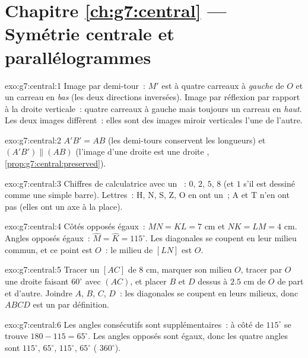 \section*{Chapitre \ref{ch:g7:central} --- Symétrie centrale et parallélogrammes}

\begin{solution}{exo:g7:central:1}
Image par demi-tour~: $M'$ est à quatre carreaux à \emph{gauche} de
$O$ et un carreau en \emph{bas} (les deux directions inversées). Image
par réflexion par rapport à la droite verticale~: quatre carreaux à
gauche mais toujours un carreau en \emph{haut}. Les deux images
diffèrent~: elles sont des images miroir verticales l'une de l'autre.
\end{solution}

\begin{solution}{exo:g7:central:2}
$A'B' = AB$ (les demi-tours conservent les longueurs) et
$(A'B') \parallel (AB)$ (l'image d'une droite est une droite
, \cref{prop:g7:central:preserved}).
\end{solution}

\begin{solution}{exo:g7:central:3}
Chiffres de calculatrice avec un ~: $0$, $2$, $5$,
$8$ (et $1$ s'il est dessiné comme une simple barre). Lettres~: H, N,
S, Z, O en ont un~; A et T n'en ont pas (elles ont un axe à la
place).
\end{solution}

\begin{solution}{exo:g7:central:4}
Côtés opposés égaux~: $MN = KL = 7$ cm et $NK = LM = 4$ cm. Angles
opposés égaux~: $\widehat M = \widehat K = 115^\circ$. Les diagonales
se coupent en leur milieu commun, et ce point est $O$~: le milieu de
$[LN]$ est $O$.
\end{solution}

\begin{solution}{exo:g7:central:5}
Tracer un  $[AC]$ de $8$ cm, marquer son milieu $O$, tracer
par $O$ une droite faisant $60^\circ$ avec $(AC)$, et placer $B$ et
$D$ dessus à $2.5$ cm de $O$ de part et d'autre. Joindre $A$, $B$,
$C$, $D$~: les diagonales se coupent en leurs milieux, donc $ABCD$
est un  par définition.
\end{solution}

\begin{solution}{exo:g7:central:6}
Les angles consécutifs sont supplémentaires~: à côté de $115^\circ$
se trouve $180 - 115 = 65^\circ$. Les angles opposés sont égaux, donc
les quatre angles sont $115^\circ$, $65^\circ$, $115^\circ$,
$65^\circ$ ( $360^\circ$).
\end{solution}

